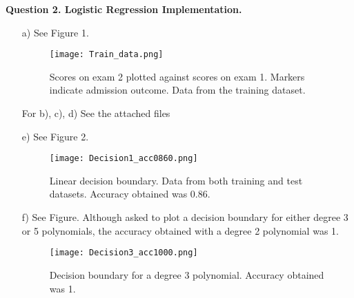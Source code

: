 \documentclass[12pt]{article}
\begin{document}
\noindent\textbf{Question 2. Logistic Regression Implementation. }
\begin{enumerate}
    \item[a)] See Figure 1.
    \begin{figure}[h]
        \centering
        \texttt{[image: Train\_data.png]}
        \caption{Scores on exam 2 plotted against scores on exam 1. Markers indicate admission outcome. Data from the training dataset.}
    \end{figure}
    \item[For] b), c), d) See the attached files
    \item[e)] See Figure 2.
    \begin{figure}[h]
        \centering
        \texttt{[image: Decision1\_acc0860.png]}
        \caption{Linear decision boundary. Data from both training and test datasets. Accuracy obtained was 0.86.}
    \end{figure}
    \item[f)] See Figure. Although asked to plot a decision boundary for either degree 3 or 5 polynomials, the accuracy obtained with a degree 2 polynomial was 1.
    \begin{figure}[h]
        \centering
        \texttt{[image: Decision3\_acc1000.png]}
        \caption{Decision boundary for a degree 3 polynomial. Accuracy obtained was 1.}
    \end{figure}
\end{enumerate}
\end{document}

